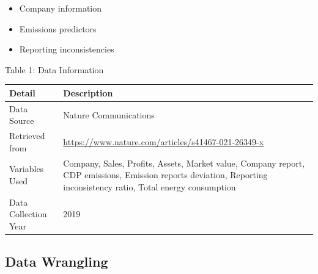 \documentclass[
  12pt,
]{article}
\providecommand{\tightlist}{%
  \setlength{\itemsep}{0pt}\setlength{\parskip}{0pt}}
\begin{document}
\begin{itemize}
\tightlist
\item
  Company information
\item
  Emissions predictors
\item
  Reporting inconsistencies
\end{itemize}

Table 1: Data Information

\begin{longtable}[]{@{}ll@{}}
\toprule
\begin{minipage}[b]{0.58\columnwidth}\raggedright
\textbf{Detail}\strut
\end{minipage} & \begin{minipage}[b]{0.36\columnwidth}\raggedright
\textbf{Description}\strut
\end{minipage}\tabularnewline
\midrule
\endhead
\begin{minipage}[t]{0.58\columnwidth}\raggedright
Data Source\strut
\end{minipage} & \begin{minipage}[t]{0.36\columnwidth}\raggedright
Nature Communications\strut
\end{minipage}\tabularnewline
\begin{minipage}[t]{0.58\columnwidth}\raggedright
Retrieved from\strut
\end{minipage} & \begin{minipage}[t]{0.36\columnwidth}\raggedright
\url{https://www.nature.com/articles/s41467-021-26349-x}\strut
\end{minipage}\tabularnewline
\begin{minipage}[t]{0.58\columnwidth}\raggedright
Variables Used\strut
\end{minipage} & \begin{minipage}[t]{0.36\columnwidth}\raggedright
Company, Sales, Profits, Assets, Market value, Company report, CDP
emissions, Emission reports deviation, Reporting inconsistency ratio,
Total energy consumption\strut
\end{minipage}\tabularnewline
\begin{minipage}[t]{0.58\columnwidth}\raggedright
Data Collection Year\strut
\end{minipage} & \begin{minipage}[t]{0.36\columnwidth}\raggedright
2019\strut
\end{minipage}\tabularnewline
\bottomrule
\end{longtable}

\hypertarget{data-wrangling}{%
\subsection{Data Wrangling}\label{data-wrangling}}
\end{document}
